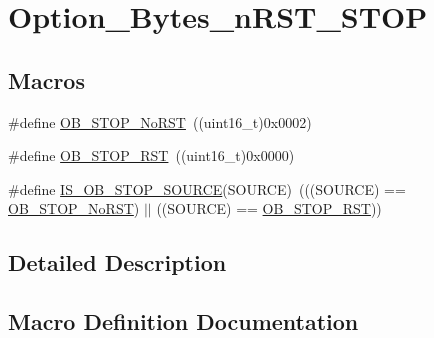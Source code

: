 \hypertarget{group___option___bytes__n_r_s_t___s_t_o_p}{}\section{Option\+\_\+\+Bytes\+\_\+n\+R\+S\+T\+\_\+\+S\+T\+OP}
\label{group___option___bytes__n_r_s_t___s_t_o_p}
\subsection*{Macros}
\begin{DoxyCompactItemize}
\item 
\#define \mbox{\hyperlink{group___option___bytes__n_r_s_t___s_t_o_p_ga6762d6e4045fec58b49dfc03c1927d51}{O\+B\+\_\+\+S\+T\+O\+P\+\_\+\+No\+R\+ST}}~((uint16\+\_\+t)0x0002)
\item 
\#define \mbox{\hyperlink{group___option___bytes__n_r_s_t___s_t_o_p_gaef92c03b1f279c532bfa13d3bb074b57}{O\+B\+\_\+\+S\+T\+O\+P\+\_\+\+R\+ST}}~((uint16\+\_\+t)0x0000)
\item 
\#define \mbox{\hyperlink{group___option___bytes__n_r_s_t___s_t_o_p_ga131ae3434f300c8317dd6b3b349c7cab}{I\+S\+\_\+\+O\+B\+\_\+\+S\+T\+O\+P\+\_\+\+S\+O\+U\+R\+CE}}(S\+O\+U\+R\+CE)~(((S\+O\+U\+R\+CE) == \mbox{\hyperlink{group___option___bytes__n_r_s_t___s_t_o_p_ga6762d6e4045fec58b49dfc03c1927d51}{O\+B\+\_\+\+S\+T\+O\+P\+\_\+\+No\+R\+ST}}) $\vert$$\vert$ ((S\+O\+U\+R\+CE) == \mbox{\hyperlink{group___option___bytes__n_r_s_t___s_t_o_p_gaef92c03b1f279c532bfa13d3bb074b57}{O\+B\+\_\+\+S\+T\+O\+P\+\_\+\+R\+ST}}))
\end{DoxyCompactItemize}


\subsection{Detailed Description}


\subsection{Macro Definition Documentation}
\mbox{\label{group___option___bytes__n_r_s_t___s_t_o_p_ga131ae3434f300c8317dd6b3b349c7cab}} 
